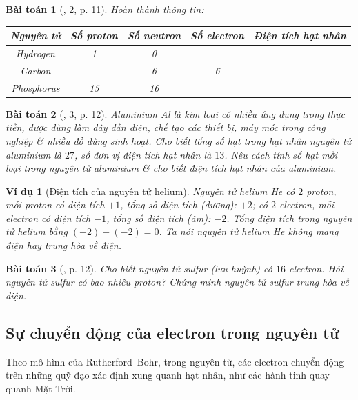 \documentclass{article}
\newtheorem{baitoan}{Bài toán}
\newtheorem{vidu}{Ví dụ}
\begin{document}
\begin{baitoan}[\cite{SGK_KHTN_7_Canh_Dieu}, 2, p. 11]
	Hoàn thành thông tin:
	\begin{table}[H]
		\centering
		\begin{tabular}{|c|c|c|c|c|}
			\hline
			Nguyên tử & Số proton & Số neutron & Số electron & Điện tích hạt nhân \\
			\hline
			Hydrogen & 1 & 0 &  &  \\
			\hline
			Carbon &  & 6 & 6 &  \\
			\hline
			Phosphorus & 15 & 16 &  &  \\
			\hline
		\end{tabular}
	\end{table}
\end{baitoan}

\begin{baitoan}[\cite{SGK_KHTN_7_Canh_Dieu}, 3, p. 12]
	Aluminium \emph{Al} là kim loại có nhiều ứng dụng trong thực tiễn, được dùng làm dây dẫn điện, chế tạo các thiết bị, máy móc trong công nghiệp \& nhiều đồ dùng sinh hoạt. Cho biết tổng số hạt trong hạt nhân nguyên tử aluminium là $27$, số đơn vị điện tích hạt nhân là $13$. Nêu cách tính số hạt mỗi loại trong nguyên tử aluminium \& cho biết điện tích hạt nhân của aluminium.
\end{baitoan}

\begin{vidu}[Điện tích của nguyên tử helium]
	Nguyên tử helium \emph{He} có $2$ proton, mỗi proton có điện tích $+1$, tổng số điện tích (dương): $+2$; có $2$ electron, mỗi electron có điện tích $-1$, tổng số điện tích (âm): $-2$. Tổng điện tích trong nguyên tử helium bằng $(+2) + (-2) = 0$. Ta nói nguyên tử helium \emph{He} \emph{không mang điện} hay \emph{trung hòa về điện}.
\end{vidu}

\begin{baitoan}[\cite{SGK_KHTN_7_Canh_Dieu}, p. 12]
	Cho biết nguyên tử sulfur (lưu huỳnh) có $16$ electron. Hỏi nguyên tử sulfur có bao nhiêu proton? Chứng minh nguyên tử sulfur trung hòa về điện.
\end{baitoan}

\subsection{Sự chuyển động của electron trong nguyên tử}
Theo mô hình của Rutherford--Bohr, trong nguyên tử, các electron chuyển động trên những quỹ đạo xác định xung quanh hạt nhân, như các hành tinh quay quanh Mặt Trời.
\end{document}
